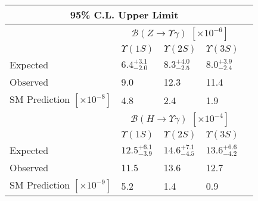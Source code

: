 \begin{tabular}{l|llll}
\multicolumn{4}{c}{95\% C.L. Upper Limit} \\
\hline
\hline
& \multicolumn{3}{c}{$\mathcal{B}(Z \rightarrow \Upsilon\gamma)$ $[\times10^{-6}]$}      \\
\cline{2-4}
&  $\Upsilon(1S)$ & $\Upsilon(2S)$ & $\Upsilon(3S)$  \\
\hline
Expected     & $6.4^{+3.1}_{-2.0}$ &  $8.3^{+4.0}_{-2.5}$  & $8.0^{+3.9}_{-2.4}$            \\
Observed     & 9.0 &  12.3  & 11.4      \\
\hline
SM Prediction $[\times10^{-8}]$ & 4.8  &  2.4  & 1.9      \\
\hline
\hline
& \multicolumn{3}{c}{$\mathcal{B}(H \rightarrow \Upsilon\gamma)$ $[\times10^{-4}]$}       \\
\cline{2-4}
&  $\Upsilon(1S)$ & $\Upsilon(2S)$ & $\Upsilon(3S)$ &   \\
\hline
Expected     & $12.5^{+6.1}_{-3.9}$ &  $14.6^{+7.1}_{-4.5}$  & $13.6^{+6.6}_{-4.2}$        \\
Observed     & 11.5 &  13.6  & 12.7     \\
\hline
SM Prediction $[\times10^{-9}]$ & 5.2  &  1.4  & 0.9      \\
\hline
\hline
\end{tabular}

